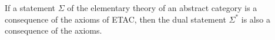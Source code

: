 If a statement $\Sigma$ of the elementary theory of an abstract category is a consequence of the axioms of ETAC, then the dual statement $\Sigma^{*}$ is also a consequence of the axioms.
